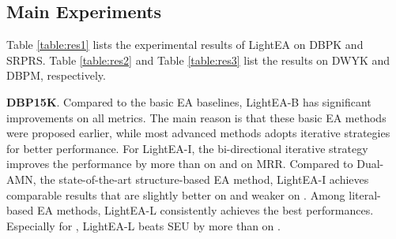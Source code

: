 \documentclass[11pt]{article}
\begin{document}
\begin{table}[t]
\caption{Experimental results on DBPM\protect\footnotemark.}
\label{table:res3}
\end{table}

\subsection{Main Experiments}
Table \ref{table:res1} lists the experimental results of LightEA on DBPK and SRPRS.
Table \ref{table:res2} and Table \ref{table:res3} list the results on DWYK and DBPM, respectively.

\noindent
\textbf{DBP15K}.
Compared to the basic EA baselines, LightEA-B has significant improvements on all metrics.
The main reason is that these basic EA methods were proposed earlier, while most advanced methods adopts iterative strategies for better performance.
For LightEA-I, the bi-directional iterative strategy improves the performance by more than  on  and  on MRR.
Compared to Dual-AMN, the state-of-the-art structure-based EA method, LightEA-I achieves comparable results that are slightly better on  and weaker on .
Among literal-based EA methods, LightEA-L consistently achieves the best performances.
Especially for , LightEA-L beats SEU by more than  on .
\end{document}
